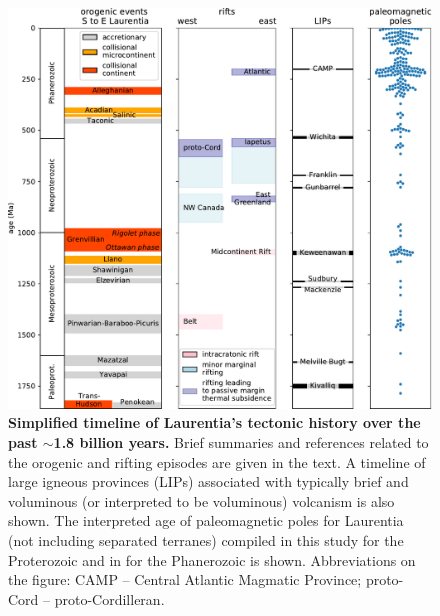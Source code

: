 \documentclass[twocolumn, switch]{article} %
\begin{document}
\begin{figure}
\centering
\includegraphics[width=\textwidth]{../Figures/Fig2_Tectonic_history.pdf}
\caption{\textbf{Simplified timeline of Laurentia's tectonic history over the past $\sim$1.8 billion years.} Brief summaries and references related to the orogenic and rifting episodes are given in the text. A timeline of large igneous provinces (LIPs) associated with typically brief and voluminous (or interpreted to be voluminous) volcanism is also shown. The interpreted age of paleomagnetic poles for Laurentia (not including separated terranes) compiled in this study for the Proterozoic and in \cite{Torsvik2012a} for the Phanerozoic is shown. Abbreviations on the figure: CAMP -- Central Atlantic Magmatic Province; proto-Cord -- proto-Cordilleran.}
\label{fig:tectonic_history}
\end{figure}
\end{document}
